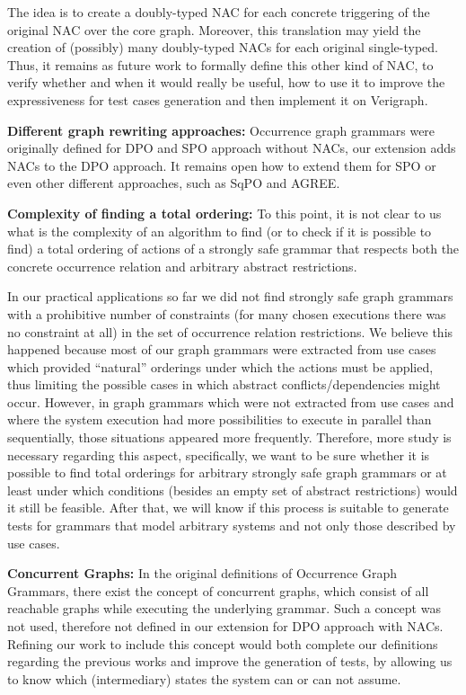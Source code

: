 The idea is to create a doubly-typed NAC for each concrete triggering of the original NAC over the core graph. Moreover, this translation may yield the creation of (possibly) many doubly-typed NACs for each original single-typed. Thus, it remains as future work to formally define this other kind of NAC, to verify whether and when it would really be useful, how to use it to improve the expressiveness for test cases generation and then implement it on Verigraph.


\textbf{Different graph rewriting approaches:} Occurrence graph grammars were originally defined for DPO and SPO approach without NACs, our extension adds NACs to the DPO approach. It remains open how to extend them for SPO or even other different approaches, such as SqPO and AGREE.

\textbf{Complexity of finding a total ordering:} To this point, it is not clear to us what is the complexity of an algorithm to find (or to check if it is possible to find) a total ordering of actions of a strongly safe grammar that respects both the concrete occurrence relation and arbitrary abstract restrictions.

  In our practical applications so far we did not find strongly safe graph grammars with a prohibitive number of constraints (for many chosen executions there was no constraint at all) in the set of occurrence relation restrictions.
  We believe this happened because most of our graph grammars were extracted from use cases which provided ``natural'' orderings under which the actions must be applied, thus limiting the possible cases in which abstract conflicts/dependencies might occur.
  However, in graph grammars which were not extracted from use cases and where the system execution had more possibilities to execute in parallel than sequentially, those situations appeared more frequently.
  Therefore, more study is necessary regarding this aspect, specifically, we want to be sure whether it is possible to find total orderings for arbitrary strongly safe graph grammars or at least under which conditions (besides an empty set of abstract restrictions) would it still be feasible.
  After that, we will know if this process is suitable to generate tests for grammars that model arbitrary systems and not only those described by use cases.

\textbf{Concurrent Graphs:} In the original definitions of Occurrence Graph Grammars, there exist the concept of concurrent graphs, which consist of all reachable graphs while executing the underlying grammar. Such a concept was not used, therefore not defined in our extension for DPO approach with NACs. Refining our work to include this concept would both complete our definitions regarding the previous works and improve the generation of tests, by allowing us to know which (intermediary) states the system can or can not assume.

